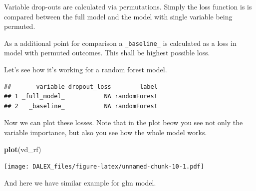 \documentclass[]{book}
\newenvironment{Shaded}{\begin{snugshade}}{\end{snugshade}}
\newcommand{\KeywordTok}[1]{\textcolor[rgb]{0.13,0.29,0.53}{\textbf{#1}}}
\newcommand{\DataTypeTok}[1]{\textcolor[rgb]{0.13,0.29,0.53}{#1}}
\newcommand{\DecValTok}[1]{\textcolor[rgb]{0.00,0.00,0.81}{#1}}
\newcommand{\StringTok}[1]{\textcolor[rgb]{0.31,0.60,0.02}{#1}}
\newcommand{\OperatorTok}[1]{\textcolor[rgb]{0.81,0.36,0.00}{\textbf{#1}}}
\newcommand{\NormalTok}[1]{#1}
\theoremstyle{definition}
\theoremstyle{definition}
\theoremstyle{definition}
\theoremstyle{remark}
\begin{document}
Variable drop-outs are calculated via permutations. Simply the loss
function is is compared between the full model and the model with single
variable being permuted.

As a additional point for comparison a \texttt{\_baseline\_} is
calculated as a loss in model with permuted outcomes. This shall be
highest possible loss.

Let's see how it's working for a random forest model.

\begin{Shaded}
\end{Shaded}

\begin{verbatim}
##       variable dropout_loss        label
## 1 _full_model_           NA randomForest
## 2   _baseline_           NA randomForest
\end{verbatim}

Now we can plot these losses. Note that in the plot beow you see not
only the variable importance, but also you see how the whole model
works.

\begin{Shaded}
\begin{Highlighting}[]
\KeywordTok{plot}\NormalTok{(vd_rf)}
\end{Highlighting}
\end{Shaded}

\texttt{[image: DALEX\_files/figure-latex/unnamed-chunk-10-1.pdf]}

And here we have similar example for glm model.
\end{document}
